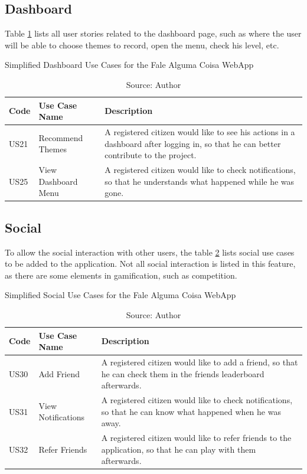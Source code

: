 \subsection{Dashboard}

Table \ref{tab:falealgumacoisa-simplified-dashboard} lists all user stories related to the dashboard page, such as where the user will be able to choose themes to record, open the menu, check his level, etc.

\begin{table}[h]
\caption{Simplified Dashboard Use Cases for the Fale Alguma Coisa WebApp}
\label{tab:falealgumacoisa-simplified-dashboard}
\centering
\begin{tabular}{|p{1cm}|p{3cm}|p{10cm}|}
\hline
    Code & Use Case Name & Description \\ \hline
    US21 & Recommend Themes & A registered citizen would like to see his actions in a dashboard after logging in, so that he can better contribute to the project. \\ \hline
    US25 & View Dashboard Menu & A registered citizen would like to check notifications, so that he understands what happened while he was gone. \\ \hline
\end{tabular}
\caption*{Source: Author}
\end{table}

\subsection{Social}

To allow the social interaction with other users, the table \ref{tab:falealgumacoisa-simplified-social} lists social use cases to be added to the application. Not all social interaction is listed in this feature, as there are some elements in gamification, such as competition.

\begin{table}[h]
\caption{Simplified Social Use Cases for the Fale Alguma Coisa WebApp}
\label{tab:falealgumacoisa-simplified-social}
\centering
\begin{tabular}{|p{1cm}|p{3cm}|p{10cm}|}
\hline
    Code & Use Case Name & Description \\ \hline
    US30 & Add Friend & A registered citizen would like to add a friend, so that he can check them in the friends leaderboard afterwards. \\ \hline
    US31 & View Notifications & A registered citizen would like to check notifications, so that he can know what happened when he was away. \\ \hline
    US32 & Refer Friends & A registered citizen would like to refer friends to the application, so that he can play with them afterwards. \\ \hline
\end{tabular}
\caption*{Source: Author}
\end{table}

